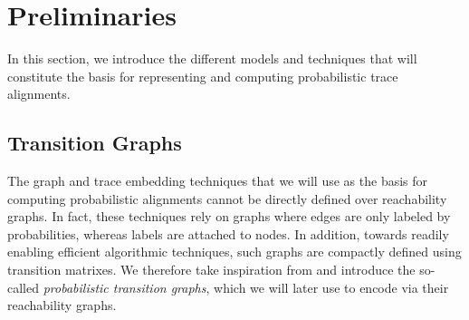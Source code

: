 
\section{Preliminaries}
\label{sec:models}
In this section, we introduce the different models and techniques that will constitute the basis for representing and computing probabilistic trace alignments.

\subsection{Transition Graphs}\label{subsec:ppn}

The graph and trace embedding techniques that we will use as the basis for computing probabilistic alignments cannot be directly defined over reachability graphs. In fact, these techniques rely on graphs where edges are only labeled by probabilities, whereas labels are attached to nodes. In addition, towards readily enabling efficient algorithmic techniques, such graphs are compactly defined using transition matrixes. We therefore take inspiration from \cite{GartnerFW03} and introduce the so-called \emph{probabilistic transition graphs}, which we will later use to encode  via their reachability graphs.

